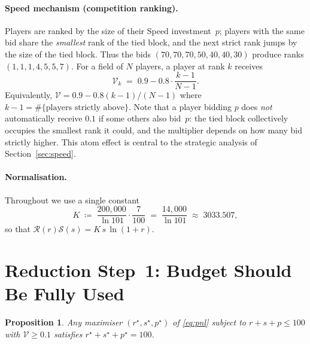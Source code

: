 \documentclass[11pt,a4paper]{article}
\newtheorem{proposition}{Proposition}
\theoremstyle{definition}
\theoremstyle{remark}
\newcommand{\R}{\mathcal{R}}
\newcommand{\Sc}{\mathcal{S}}
\newcommand{\Sp}{\mathcal{V}}
\begin{document}
\paragraph{Speed mechanism (competition ranking).}
Players are ranked by the size of their Speed investment~\(p\); players with the
same bid share the \emph{smallest} rank of the tied block, and the next strict
rank jumps by the size of the tied block. Thus the bids
\((70,70,70,50,40,40,30)\) produce ranks \((1,1,1,4,5,5,7)\). For a field of
\(N\) players, a player at rank \(k\) receives
\begin{equation}\label{eq:speedlinear}
\Sp_k \;=\; 0.9 - 0.8\cdot\frac{k-1}{N-1}.
\end{equation}
Equivalently, \(\Sp=0.9-0.8(k\!-\!1)/(N\!-\!1)\) where \(k-1=\#\{\text{players strictly above}\}\). Note that a player bidding \(p\)
does \emph{not} automatically receive \(0.1\) if some others also bid~\(p\): the
tied block collectively occupies the smallest rank it could, and the multiplier
depends on how many bid strictly higher. This atom effect is central to the
strategic analysis of Section~\ref{sec:speed}.

\paragraph{Normalisation.} Throughout we use a single constant
\begin{equation}\label{eq:Kdef}
K \;\coloneqq\; \frac{200{,}000}{\ln 101}\cdot\frac{7}{100}
\;=\; \frac{14{,}000}{\ln 101} \;\approx\; 3033.507,
\end{equation}
so that
\(\R(r)\Sc(s)=K\,s\,\ln(1+r)\).

\section{Reduction Step~1: Budget Should Be Fully Used}

\begin{proposition}\label{prop:fullbudget}
Any maximiser \((r^\star,s^\star,p^\star)\) of \eqref{eq:pnl} subject to
\(r+s+p\le 100\) with \(\Sp\ge 0.1\) satisfies \(r^\star+s^\star+p^\star=100\).
\end{proposition}
\end{document}
